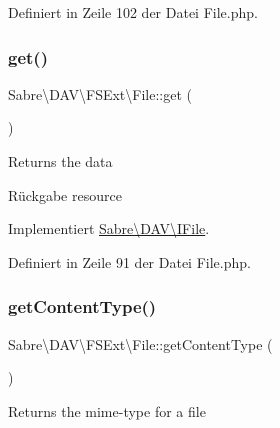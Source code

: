 Definiert in Zeile 102 der Datei File.\+php.

\mbox{\label{class_sabre_1_1_d_a_v_1_1_f_s_ext_1_1_file_a80f50ccff4fdf801c1a531ec4c62975f}} 
\subsubsection{\texorpdfstring{get()}{get()}}
{\footnotesize\ttfamily Sabre\textbackslash{}\+D\+A\+V\textbackslash{}\+F\+S\+Ext\textbackslash{}\+File\+::get (\begin{DoxyParamCaption}{ }\end{DoxyParamCaption})}

Returns the data

\begin{DoxyReturn}{Rückgabe}
resource 
\end{DoxyReturn}


Implementiert \mbox{\hyperlink{interface_sabre_1_1_d_a_v_1_1_i_file_a3102812af0567c3cfd9cd6c20104bd27}{Sabre\textbackslash{}\+D\+A\+V\textbackslash{}\+I\+File}}.



Definiert in Zeile 91 der Datei File.\+php.

\mbox{\label{class_sabre_1_1_d_a_v_1_1_f_s_ext_1_1_file_a0a37951c9e67dde2cd9c33c67015614d}} 
\subsubsection{\texorpdfstring{get\+Content\+Type()}{getContentType()}}
{\footnotesize\ttfamily Sabre\textbackslash{}\+D\+A\+V\textbackslash{}\+F\+S\+Ext\textbackslash{}\+File\+::get\+Content\+Type (\begin{DoxyParamCaption}{ }\end{DoxyParamCaption})}

Returns the mime-\/type for a file


